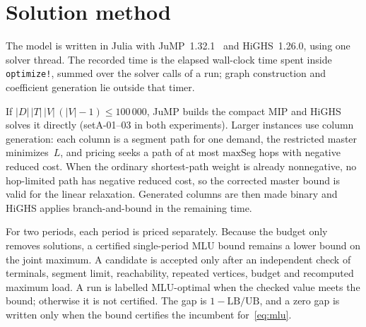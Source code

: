 \section{Solution method}

The model is written in Julia with JuMP~1.32.1~\citep{jump2017} and HiGHS~1.26.0, using one
solver thread.
The recorded time is the elapsed wall-clock time spent inside \texttt{optimize!}, summed over
the solver calls of a run; graph construction and coefficient generation lie outside that timer.

If $|D|\,|T|\,|V|\,(|V|-1)\le 100\,000$, JuMP builds the compact MIP and HiGHS solves it
directly (setA-01--03 in both experiments).
Larger instances use column generation: each column is a segment path for one demand, the
restricted master minimizes~$L$, and pricing seeks a path of at most $\mathrm{maxSeg}$ hops
with negative reduced cost.
When the ordinary shortest-path weight is already nonnegative, no hop-limited path has negative
reduced cost, so the corrected master bound is valid for the linear relaxation.
Generated columns are then made binary and HiGHS applies branch-and-bound in the remaining time.

For two periods, each period is priced separately.
Because the budget only removes solutions, a certified single-period MLU bound remains a lower
bound on the joint maximum.
A candidate is accepted only after an independent check of terminals, segment limit, reachability,
repeated vertices, budget and recomputed maximum load.
A run is labelled MLU-optimal when the checked value meets the bound; otherwise it is not
certified.
The gap is $1-\mathrm{LB}/\mathrm{UB}$, and a zero gap is written only when the bound certifies
the incumbent for~\eqref{eq:mlu}.

